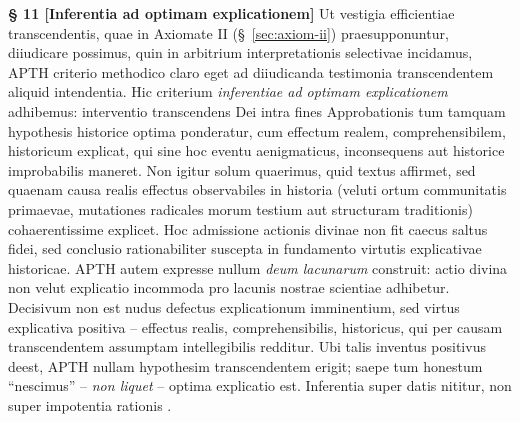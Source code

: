 \documentclass[11pt,a4paper]{article}
\makeatletter
\newcommand{\apth}{{\apthfont APTH}\hspace{0.15em}\xspace}
\newcommand{\apthsec}[3]{%
  \phantomsection%
  \def\@currentlabel{#1}%
  \label{sec:#3}%
  \textbf{§ #1 [#2]}%
}
\makeatother
\begin{document}
\apthsec{11}{Inferentia ad optimam explicationem}{inferenz} Ut vestigia efficientiae transcendentis, quae in Axiomate II (§~\ref{sec:axiom-ii}) praesupponuntur, diiudicare possimus, quin in arbitrium interpretationis selectivae incidamus, \apth criterio methodico claro eget ad diiudicanda testimonia transcendentem aliquid intendentia. Hic criterium \textit{inferentiae ad optimam explicationem} \citep{harman1965,lipton2004,wright1992} adhibemus: interventio transcendens Dei intra fines Approbationis tum tamquam hypothesis historice optima ponderatur, cum effectum realem, comprehensibilem, historicum explicat, qui sine hoc eventu aenigmaticus, inconsequens aut historice improbabilis maneret. Non igitur solum quaerimus, quid textus affirmet, sed quaenam causa realis effectus observabiles in historia (veluti ortum communitatis primaevae, mutationes radicales morum testium aut structuram traditionis) cohaerentissime explicet. Hoc admissione actionis divinae non fit caecus saltus fidei, sed conclusio rationabiliter suscepta in fundamento virtutis explicativae historicae. \apth autem expresse nullum \textit{deum lacunarum} construit: actio divina non velut explicatio incommoda pro lacunis nostrae scientiae adhibetur. Decisivum non est nudus defectus explicationum imminentium, sed virtus explicativa positiva -- effectus realis, comprehensibilis, historicus, qui per causam transcendentem assumptam intellegibilis redditur. Ubi talis inventus positivus deest, \apth nullam hypothesim transcendentem erigit; saepe tum honestum ``nescimus'' -- \textit{non liquet} -- optima explicatio est. Inferentia super datis nititur, non super impotentia rationis \citep{bonhoeffer1951,coulson1955,plantinga2011}.
\end{document}
